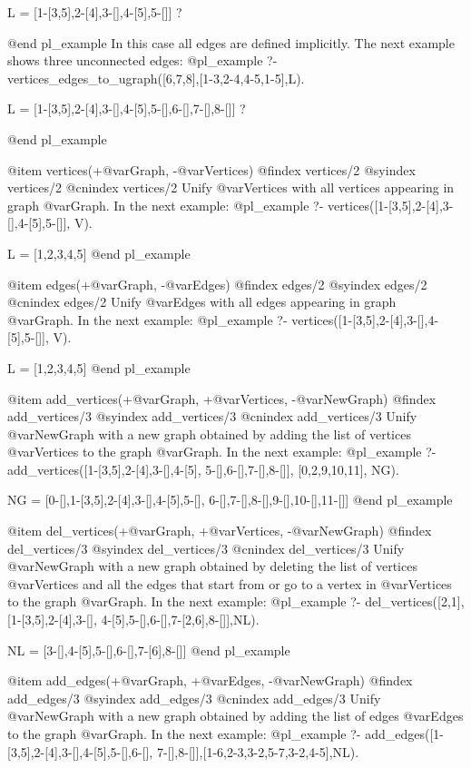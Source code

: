 L = [1-[3,5],2-[4],3-[],4-[5],5-[]] ? 

@end pl_example
In this case all edges are defined implicitly. The next example shows
three unconnected edges:
@pl_example 
?- vertices_edges_to_ugraph([6,7,8],[1-3,2-4,4-5,1-5],L).

L = [1-[3,5],2-[4],3-[],4-[5],5-[],6-[],7-[],8-[]] ? 

@end pl_example

@item vertices(+@var{Graph}, -@var{Vertices})
@findex  vertices/2
@syindex vertices/2
@cnindex vertices/2
Unify @var{Vertices} with all vertices appearing in graph
@var{Graph}. In the next example:
@pl_example
?- vertices([1-[3,5],2-[4],3-[],4-[5],5-[]], V).

L = [1,2,3,4,5]
@end pl_example

@item edges(+@var{Graph}, -@var{Edges})
@findex  edges/2
@syindex edges/2
@cnindex edges/2
Unify @var{Edges} with all edges appearing in graph
@var{Graph}. In the next example:
@pl_example
?- vertices([1-[3,5],2-[4],3-[],4-[5],5-[]], V).

L = [1,2,3,4,5]
@end pl_example

@item add_vertices(+@var{Graph}, +@var{Vertices}, -@var{NewGraph})
@findex  add_vertices/3
@syindex add_vertices/3
@cnindex add_vertices/3
Unify @var{NewGraph} with a new graph obtained by adding the list of
vertices @var{Vertices} to the graph @var{Graph}. In the next example:
@pl_example
?- add_vertices([1-[3,5],2-[4],3-[],4-[5],
                 5-[],6-[],7-[],8-[]],
                [0,2,9,10,11],
                   NG).

NG = [0-[],1-[3,5],2-[4],3-[],4-[5],5-[],
      6-[],7-[],8-[],9-[],10-[],11-[]]
@end pl_example

@item del_vertices(+@var{Graph}, +@var{Vertices}, -@var{NewGraph})
@findex  del_vertices/3
@syindex del_vertices/3
@cnindex del_vertices/3
Unify @var{NewGraph} with a new graph obtained by deleting the list of
vertices @var{Vertices} and all the edges that start from or go to a
vertex in @var{Vertices} to the graph @var{Graph}. In the next example:
@pl_example
?- del_vertices([2,1],[1-[3,5],2-[4],3-[],
                 4-[5],5-[],6-[],7-[2,6],8-[]],NL).

NL = [3-[],4-[5],5-[],6-[],7-[6],8-[]]
@end pl_example

@item add_edges(+@var{Graph}, +@var{Edges}, -@var{NewGraph})
@findex  add_edges/3
@syindex add_edges/3
@cnindex add_edges/3
Unify @var{NewGraph} with a new graph obtained by adding the list of
edges @var{Edges} to the graph @var{Graph}. In the next example:
@pl_example
?- add_edges([1-[3,5],2-[4],3-[],4-[5],5-[],6-[],
              7-[],8-[]],[1-6,2-3,3-2,5-7,3-2,4-5],NL).

